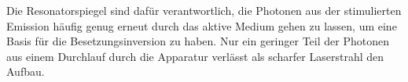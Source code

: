 Die Resonatorspiegel sind dafür verantwortlich, die Photonen aus der stimulierten Emission häufig genug erneut durch das aktive Medium gehen zu lassen, um eine Basis für die Besetzungsinversion zu haben. Nur ein geringer Teil der Photonen aus einem Durchlauf durch die Apparatur verlässt als scharfer Laserstrahl den Aufbau.
